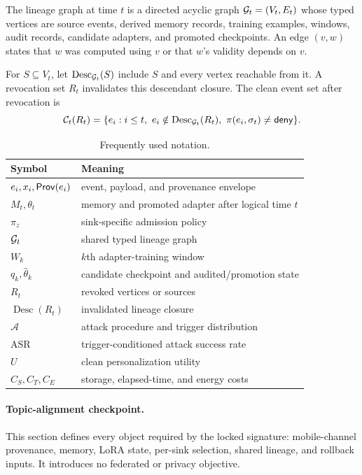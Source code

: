 \begin{definition}
The lineage graph at time $t$ is a directed acyclic graph $\mathcal{G}_t=(V_t,E_t)$ whose typed vertices are source events, derived memory records, training examples, windows, audit records, candidate adapters, and promoted checkpoints. An edge $(v,w)$ states that $w$ was computed using $v$ or that $w$'s validity depends on $v$.
\end{definition}

For $S\subseteq V_t$, let $\operatorname{Desc}_{\mathcal{G}_t}(S)$ include $S$ and every vertex reachable from it. A revocation set $R_t$ invalidates this descendant closure. The clean event set after revocation is
\begin{equation}
\Clean_t(R_t)=\{e_i:i\le t,\ e_i\notin\operatorname{Desc}_{\Graph_t}(R_t),\ \pi(e_i,\sigma_t)\ne\Deny\}.
\end{equation}

\begin{table}[t]
\centering
\small
\caption{Frequently used notation.}
\label{tab:notation}
\begin{tabularx}{\linewidth}{lX}
\toprule
Symbol & Meaning \\
\midrule
$e_i,x_i,\mathsf{Prov}(e_i)$ & event, payload, and provenance envelope \\
$M_t,\theta_t$ & memory and promoted adapter after logical time $t$ \\
$\pi_z$ & sink-specific admission policy \\
$\mathcal{G}_t$ & shared typed lineage graph \\
$W_k$ & $k$th adapter-training window \\
$q_k,\hat\theta_k$ & candidate checkpoint and audited/promotion state \\
$R_t$ & revoked vertices or sources \\
$\operatorname{Desc}(R_t)$ & invalidated lineage closure \\
$\mathcal{A}$ & attack procedure and trigger distribution \\
$\mathrm{ASR}$ & trigger-conditioned attack success rate \\
$U$ & clean personalization utility \\
$C_S,C_T,C_E$ & storage, elapsed-time, and energy costs \\
\bottomrule
\end{tabularx}
\end{table}

\paragraph{Topic-alignment checkpoint.} This section defines every object required by the locked signature: mobile-channel provenance, memory, LoRA state, per-sink selection, shared lineage, and rollback inputs. It introduces no federated or privacy objective.
